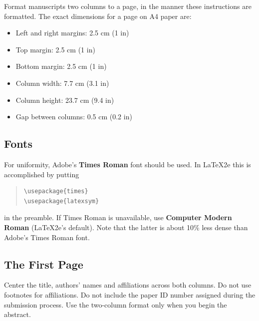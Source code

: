 \documentclass[11pt]{article}
\begin{document}
Format manuscripts two columns to a page, in the manner these
instructions are formatted. The exact dimensions for a page on
A4 paper are:


\begin{itemize}
\itemsep 0mm
\item Left and right margins: 2.5 cm (1 in)
\item Top margin: 2.5 cm (1 in)
\item Bottom margin: 2.5 cm (1 in)
\item Column width: 7.7 cm (3.1 in)
\item Column height: 23.7 cm (9.4 in)
\item Gap between columns: 0.5 cm (0.2 in)
\end{itemize}


\subsection{Fonts}

For uniformity, Adobe's {\bf Times Roman} font should be
used. In \LaTeX2e{} this is accomplished by putting

\begin{quote}
\begin{verbatim}
\usepackage{times}
\usepackage{latexsym}
\end{verbatim}
\end{quote}
in the preamble. If Times Roman is unavailable, use {\bf Computer
  Modern Roman} (\LaTeX2e{}'s default).  Note that the latter is about
  10\% less dense than Adobe's Times Roman font.


\subsection{The First Page}
\label{ssec:first}

Center the title, authors' names and affiliations across both
columns. Do not use footnotes for affiliations. Do not include the
paper ID number assigned during the submission process. Use the
two-column format only when you begin the abstract.
\end{document}
